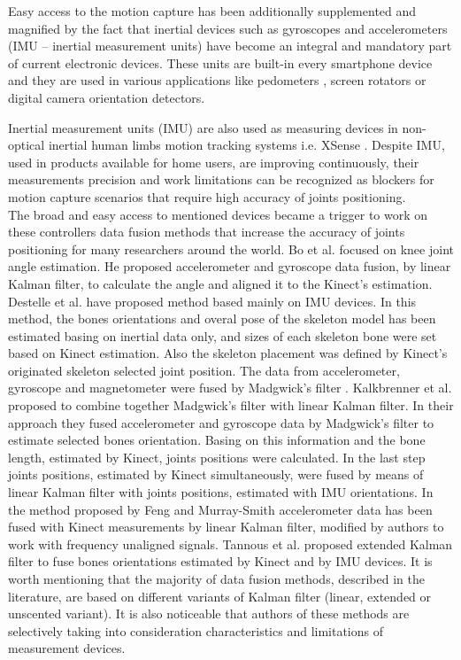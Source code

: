 \documentclass[sensors,article,submit,moreauthors,pdftex,10pt,a4paper]{mdpi}
\begin{document}
Easy access to the motion capture has been additionally supplemented and magnified by the fact that inertial devices such as gyroscopes and accelerometers (IMU – inertial measurement units) have become an integral and mandatory part of current electronic devices. These units are built-in every smartphone device and they are used in various applications like pedometers \cite{Huang2012,Jayalath2013}, screen rotators \cite{Pedley2013} or digital camera orientation detectors.

Inertial measurement units (IMU) are also used as measuring devices in non-optical inertial human limbs motion tracking systems i.e. XSense \cite{XsensCorp}. Despite IMU, used in products available for home users, are improving continuously, their measurements precision and work limitations can be recognized as blockers for motion capture scenarios that require high accuracy of joints positioning.\\%
The broad and easy access to mentioned devices became a trigger to work on these controllers data fusion methods that increase the accuracy of joints positioning for many researchers around the world. Bo et al. \cite{Bo2011a} focused on knee joint angle estimation. He proposed accelerometer and gyroscope data fusion, by linear Kalman filter, to calculate the angle and aligned it to the Kinect’s estimation. Destelle et al. \cite{Destelle2014} have proposed method based mainly on IMU devices. In this method, the bones orientations and overal pose of the skeleton model has been estimated basing on inertial data only, and sizes of each skeleton bone were set based on Kinect estimation. Also the skeleton placement was defined by Kinect's originated skeleton selected joint position. The data from accelerometer, gyroscope and magnetometer were fused by Madgwick’s filter \cite{Madgwick2011}. Kalkbrenner et al. \cite{Kalkbrenner2014} proposed to combine together Madgwick’s filter with linear Kalman filter. In their approach they fused accelerometer and gyroscope data by Madgwick’s filter to estimate selected bones orientation. Basing on this information and the bone length, estimated by Kinect, joints positions were calculated. In the last step joints positions, estimated by Kinect simultaneously, were fused by means of linear Kalman filter with joints positions, estimated with IMU orientations. In the method proposed by Feng and Murray-Smith \cite{Murray-Smith2014} accelerometer data has been fused with Kinect measurements by linear Kalman filter, modified by authors to work with frequency unaligned signals. Tannous et al. \cite{Tannous2016} proposed extended Kalman filter to fuse bones orientations estimated by Kinect and by IMU devices. It is worth mentioning that the majority of data fusion methods, described in the literature, are based on different variants of Kalman filter (linear, extended or unscented variant). It is also noticeable that authors of these methods are selectively taking into consideration characteristics and limitations of measurement devices.
\end{document}
